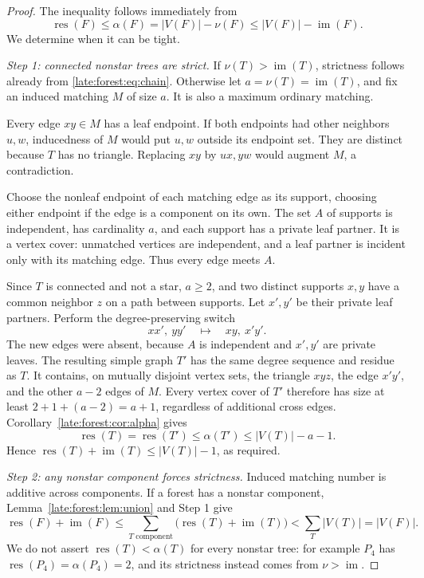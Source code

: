 \documentclass[11pt,a4paper]{article}
\theoremstyle{definition}\newtheorem{definition}[theorem]{Definition}
\theoremstyle{remark}\newtheorem{remark}[theorem]{Remark}
\newcommand{\res}{\operatorname{res}}
\newcommand{\im}{\operatorname{im}}
\begin{document}
\begin{proof}
The inequality follows immediately from
\begin{equation}\label{late:forest:eq:chain}
\res(F)\le\alpha(F)=|V(F)|-\nu(F)
\le |V(F)|-\im(F).
\end{equation}
We determine when it can be tight.

\medskip\noindent\emph{Step 1: connected nonstar trees are strict.}
If $\nu(T)>\im(T)$, strictness follows already from \eqref{late:forest:eq:chain}.
Otherwise let $a=\nu(T)=\im(T)$, and fix an induced matching $M$ of size $a$.
It is also a maximum ordinary matching.

Every edge $xy\in M$ has a leaf endpoint. If both endpoints had other
neighbors $u,w$, inducedness of $M$ would put $u,w$ outside its endpoint set.
They are distinct because $T$ has no triangle. Replacing $xy$ by $ux,yw$
would augment $M$, a contradiction.

Choose the nonleaf endpoint of each matching edge as its support, choosing
either endpoint if the edge is a component on its own. The set $A$ of
supports is independent, has cardinality $a$, and each support has a private
leaf partner. It is a vertex cover: unmatched vertices are independent, and
a leaf partner is incident only with its matching edge. Thus every edge meets
$A$.

Since $T$ is connected and not a star, $a\ge2$, and two distinct supports
$x,y$ have a common neighbor $z$ on a path between supports. Let $x',y'$ be
their private leaf partners. Perform the degree-preserving switch
\[
xx',\ yy'\quad\longmapsto\quad xy,\ x'y'.
\]
The new edges were absent, because $A$ is independent and $x',y'$ are private
leaves. The resulting simple graph $T'$ has the same degree sequence and
residue as $T$. It contains, on mutually disjoint vertex sets, the triangle
$xyz$, the edge $x'y'$, and the other $a-2$ edges of $M$. Every vertex cover of
$T'$ therefore has size at least $2+1+(a-2)=a+1$, regardless of additional
cross edges. Corollary~\ref{late:forest:cor:alpha} gives
\[
\res(T)=\res(T')\le\alpha(T')\le |V(T)|-a-1.
\]
Hence $\res(T)+\im(T)\le |V(T)|-1$, as required.

\medskip\noindent\emph{Step 2: any nonstar component forces strictness.}
Induced matching number is additive across components. If a forest has a
nonstar component, Lemma~\ref{late:forest:lem:union} and Step 1 give
\[
\res(F)+\im(F)
\le\sum_{T\text{ component}}\bigl(\res(T)+\im(T)\bigr)
<\sum_T |V(T)|=|V(F)|.
\]
We do not assert $\res(T)<\alpha(T)$ for every nonstar tree: for example $P_4$
has $\res(P_4)=\alpha(P_4)=2$, and its strictness instead comes from $\nu>\im$.


\end{proof}
\end{document}
